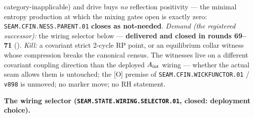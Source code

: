 {category-inapplicable) and drive buys \emph{no} reflection
positivity --- the minimal entropy production at which the
mixing gates open is exactly zero:
\texttt{SEAM.CFIN.NESS.PARENT.01} \textbf{closes as
not-needed}.  \emph{Demand (the registered successor):} the
wiring selector below --- \textbf{delivered and closed in
rounds 69--71} ().
\emph{Kill:} a covariant strict
2-cycle RP point, or an equilibrium collar witness whose
compression breaks the canonical census.  The witnesses live on
a different covariant coupling direction than the deployed
$A_{\rm int}$ wiring --- whether the actual seam allows them is
untouched; the [O] premise of
\texttt{SEAM.CFIN.WICKFUNCTOR.01} / \texttt{v898} is unmoved;
no marker move; no RH statement.\par}

\par\smallskip\noindent\textbf{The wiring selector
(\texttt{SEAM.STATE.WIRING.\allowbreak SELECTOR.01}, closed:
deployment choice).}
